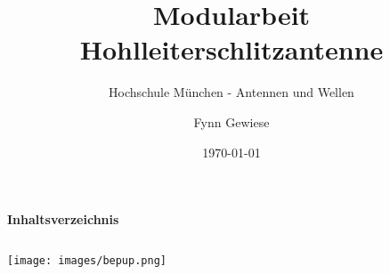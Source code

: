 \documentclass[
  aspectratio=169, %
]{beamer}
\title{Modularbeit Hohlleiterschlitzantenne}
\subtitle{Hochschule München - Antennen und Wellen}
\author{Fynn Gewiese}
\institute{Betreuer: Prof. Dr.-Ing. G. Strauß}
\date{\today}
\begin{document}
\maketitle

\begin{frame}[plain]{\Large \textbf{Inhaltsverzeichnis}}
\begin{columns}[T]
    \begin{column}{0.48\textwidth}
        \begin{minipage}[t]{\linewidth}
            \centering
            \texttt{[image: images/bepup.png]}
            \label{fig:marine_radar}
        \end{minipage}
    \end{column}
    
    \begin{column}{0.48\textwidth}
        \vspace{1cm}
        \tableofcontents
    \end{column}
\end{columns}
\end{frame}
\end{document}
